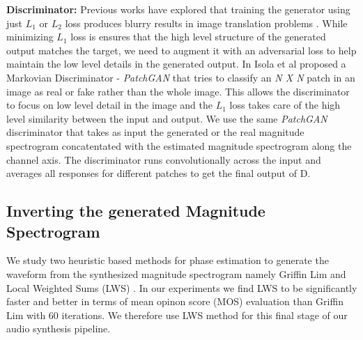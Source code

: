 \documentclass[a4paper]{article}
\begin{document}
\textbf{Discriminator:} Previous works have explored that training the generator using just $L_1$ or $L_2$ loss produces blurry results in image translation problems \cite{pathakCVPR16context,zhang2016colorful}. While minimizing $L_1$ loss is ensures that the high level structure of the generated output matches the target, we need to augment it with an adversarial loss to help maintain the low level details in the generated output.
In \cite{pix2pix} Isola et al proposed a Markovian Discriminator - \textit{PatchGAN}  that tries to classify an \textit{N X N}  patch in an image as real or fake rather than the whole image. This allows the discriminator to focus on low level detail in the image and the $L_1$ loss takes care of the high level similarity between the input and output. We use the same \textit{PatchGAN} discriminator that takes as input the generated or the real magnitude spectrogram concatentated with the estimated magnitude spectrogram along the channel axis. The discriminator runs convolutionally across the input and averages all responses for different patches to get the final output of D.

\subsection{Inverting the generated Magnitude Spectrogram}
We study two heuristic based methods for phase estimation to generate the waveform from the synthesized magnitude spectrogram namely Griffin Lim \cite{griffinlim} and Local Weighted Sums (LWS) \cite{lws}. In our experiments we find LWS \cite{lws} to be significantly faster and better in terms of mean opinon score (MOS) evaluation than Griffin Lim with 60 iterations. 
We therefore use LWS method for this final stage of our audio synthesis pipeline.




\end{document}
